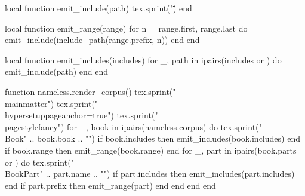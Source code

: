 \documentclass[11pt]{book}
\makeatletter
\newcommand{\BookHeading}[1]{%
    \HiddenChapterHeading{#1}%
}
\newcommand{\HiddenChapterHeading}[1]{%
    \csname chapter\endcsname*{#1}%
}
\newcommand{\ChapterLinkText}[1]{%
    \ifConfigOutputModeMobile
        {\color{MobileLinkColor}\underLine{#1}}%
    \else
        {\color{TextColor}#1}%
    \fi
}
\newcommand{\ChapterLinkCell}[1]{%
    \hyperlink{chapter.\CurrentBook.#1}{\makebox[0.19\linewidth][c]{\ChapterLinkText{\strut #1}}}%
}
\newcommand{\ChapterLinkEmptyCell}{%
    \makebox[0.19\linewidth][c]{\strut}%
}
\newcommand{\ChapterLinkFillRow}{%
    \ifnum\ChapterLinkColumnIndex=5
    \else
        \ChapterLinkFillIndex=\ChapterLinkColumnIndex
        \loop
            \advance\ChapterLinkFillIndex by 1
            \ChapterLinkEmptyCell
            \ifnum\ChapterLinkFillIndex<5
        \repeat
    \fi
}
\newcommand{\ChapterLinkRange}[1]{%
    \ChapterLinkIndex=1
    \ChapterLinkColumnIndex=1
    \loop
        \ChapterLinkCell{\the\ChapterLinkIndex}%
        \ifnum\ChapterLinkIndex<#1\relax
            \ifnum\ChapterLinkColumnIndex=5
                \par\nobreak\vspace{0.55em}%
                \ChapterLinkColumnIndex=1
            \else
                \advance\ChapterLinkColumnIndex by 1
            \fi
        \fi
        \advance\ChapterLinkIndex by 1
        \ifnum\ChapterLinkIndex<\numexpr#1+1\relax
    \repeat
    \ChapterLinkFillRow
}
\newcommand{\ChapterLinkArray}{%
    \par\nobreak\medskip
    \begingroup
    \raggedright
    \large
    \@ifundefined{ChapterLinkList@\CurrentBook}{%
        \@ifundefined{ChapterLinkRange@\CurrentBook}{}{%
            \ChapterLinkRange{\csname ChapterLinkRange@\CurrentBook\endcsname}%
        }%
    }{%
        \csname ChapterLinkList@\CurrentBook\endcsname
    }%
    \par\nobreak\medskip
    \endgroup
}
\newcommand{\ChapterLinksForBook}[1]{%
    \begingroup
    \def\CurrentBook{#1}%
    \ChapterLinkArray
    \endgroup
}
\newcommand{\PlainBookChapterLinkArray}[1]{%
    \@ifundefined{BookChapterLinkList@#1}{%
        \ChapterLinksForBook{#1}%
    }{%
        \csname BookChapterLinkList@#1\endcsname
    }%
}
\newcommand{\ChapterSummaryLinksForBook}[1]{%
    \begingroup
    \def\CurrentBook{#1}%
    \@ifundefined{BookChapterSummaryLinkList@#1}{%
        \ChapterLinksForBook{#1}%
    }{%
        \csname BookChapterSummaryLinkList@#1\endcsname
    }%
    \endgroup
}
\newcommand{\FancyBookChapterLinkArray}[1]{%
    \par\nobreak\medskip
    \begingroup
    \RaggedRight
    \footnotesize
    \setlength{\parskip}{0.18em}%
    \setlength{\columnsep}{0.9em}%
    \noindent\makebox[\linewidth][c]{%
    \begin{minipage}{\dimexpr\linewidth-0.5in\relax}
    \begin{multicols}{2}
    \@ifundefined{BookChapterSummaryLinkList@#1}{%
        \ChapterSummaryLinksForBook{#1}%
    }{%
        \csname BookChapterSummaryLinkList@#1\endcsname
    }%
    \end{multicols}
    \end{minipage}%
    }%
    \par\nobreak\medskip
    \endgroup
}
\newcommand{\BookChapterLinkArray}[1]{%
    \ifIndividualBookTitlePageStyleFancy
        \FancyBookChapterLinkArray{#1}%
    \else
        \PlainBookChapterLinkArray{#1}%
        \BookExtraLinkArray{#1}%
    \fi
}
\newcommand{\BookExtraLinkArray}[1]{%
    \@ifundefined{BookExtraLinkList@#1}{}{%
        \par\nobreak\medskip
        \begingroup
        \centering
        \large
        \csname BookExtraLinkList@#1\endcsname
        \par\nobreak\medskip
        \endgroup
    }%
}
\DeclareRobustCommand{\TableOfContentsLink}[1]{%
    \hyperlink{tableofcontents}{#1}%
}
\newcommand{\Book}[1]{%
    \def\CurrentTitleBook{#1}%
    \BookHeading{\TableOfContentsLink{#1}}%
    \phantomsection
    \hypertarget{book.#1}{}%
    \def\CurrentBook{#1}%
    \addcontentsline{toc}{chapter}{#1}%
    \BookChapterLinkArray{#1}%
}
\newcommand{\BookPart}[1]{%
    \def\CurrentBook{#1}%
}
\makeatother
\begin{document}
\begin{luacode*}
local function emit_include(path)
  tex.sprint("\")
end

local function emit_range(range)
  for n = range.first, range.last do
    emit_include(include_path(range.prefix, n))
  end
end

local function emit_includes(includes)
  for _, path in ipairs(includes or {}) do
    emit_include(path)
  end
end

function nameless.render_corpus()
  tex.sprint("\\mainmatter")
  tex.sprint("\\hypersetup{pageanchor=true}")
  tex.sprint("\\pagestyle{fancy}")
  for _, book in ipairs(nameless.corpus) do
    tex.sprint("\\Book{" .. book.book .. "}")
    if book.includes then emit_includes(book.includes) end
    if book.range then emit_range(book.range) end
    for _, part in ipairs(book.parts or {}) do
      tex.sprint("\\BookPart{" .. part.name .. "}")
      if part.includes then emit_includes(part.includes) end
      if part.prefix then emit_range(part) end
    end
  end
end
\end{luacode*}

\end{document}
